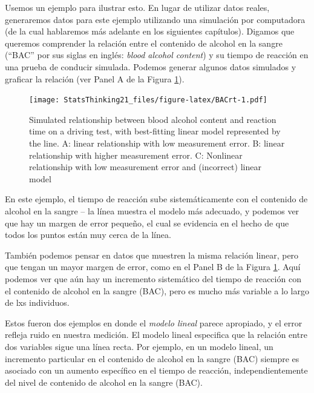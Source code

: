 \documentclass[
  12pt,
]{book}
\theoremstyle{definition}
\theoremstyle{definition}
\theoremstyle{definition}
\theoremstyle{remark}
\begin{document}
Usemos un ejemplo para ilustrar esto. En lugar de utilizar datos reales, generaremos datos para este ejemplo utilizando una simulación por computadora (de la cual hablaremos más adelante en los siguientes capítulos). Digamos que queremos comprender la relación entre el contenido de alcohol en la sangre (``BAC'' por sus siglas en inglés: \emph{blood alcohol content}) y su tiempo de reacción en una prueba de conducir simulada. Podemos generar algunos datos simulados y graficar la relación (ver Panel A de la Figura \ref{fig:BACrt}).

\begin{figure}
\centering
\texttt{[image: StatsThinking21\_files/figure-latex/BACrt-1.pdf]}
\caption{\label{fig:BACrt}Simulated relationship between blood alcohol content and reaction time on a driving test, with best-fitting linear model represented by the line. A: linear relationship with low measurement error. B: linear relationship with higher measurement error. C: Nonlinear relationship with low measurement error and (incorrect) linear model}
\end{figure}

En este ejemplo, el tiempo de reacción sube sistemáticamente con el contenido de alcohol en la sangre -- la línea muestra el modelo más adecuado, y podemos ver que hay un margen de error pequeño, el cual se evidencia en el hecho de que todos los puntos están muy cerca de la línea.

También podemos pensar en datos que muestren la misma relación linear, pero que tengan un mayor margen de error, como en el Panel B de la Figura \ref{fig:BACrt}. Aquí podemos ver que aún hay un incremento sistemático del tiempo de reacción con el contenido de alcohol en la sangre (BAC), pero es mucho más variable a lo largo de lxs individuos.

Estos fueron dos ejemplos en donde el \emph{modelo lineal} parece apropiado, y el error refleja ruido en nuestra medición. El modelo lineal especifica que la relación entre dos variables sigue una línea recta. Por ejemplo, en un modelo lineal, un incremento particular en el contenido de alcohol en la sangre (BAC) siempre es asociado con un aumento específico en el tiempo de reacción, independientemente del nivel de contenido de alcohol en la sangre (BAC).
\end{document}

